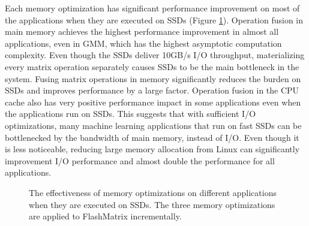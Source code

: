 Each memory optimization has significant performance improvement on most of
the applications when they are executed on SSDs (Figure \ref{perf:opts}).
Operation fusion in main memory achieves
the highest performance improvement in almost all applications, even in GMM,
which has the highest asymptotic computation complexity. Even though the SSDs
deliver 10GB/s I/O throughput, materializing every matrix operation separately
causes SSDs to be the main bottleneck in the system.
Fusing matrix operations in memory significantly reduces the burden on SSDs and
improves performance by a large factor. Operation fusion in the CPU cache also
has very positive performance impact in some applications even when
the applications run on SSDs. This suggests that with sufficient I/O optimizations,
many machine learning applications that run on fast SSDs can be bottlenecked by
the bandwidth of main memory, instead of I/O. Even though it is less noticeable,
reducing large memory allocation from Linux can significantly improvement I/O
performance and almost double the performance for all applications.

\begin{figure}
	\begin{center}
		\footnotesize
		
		\caption{The effectiveness of memory optimizations on different
			applications when they are executed on SSDs. The three memory
		optimizations are applied to FlashMatrix incrementally.}
		\label{perf:opts}
	\end{center}
\end{figure}
